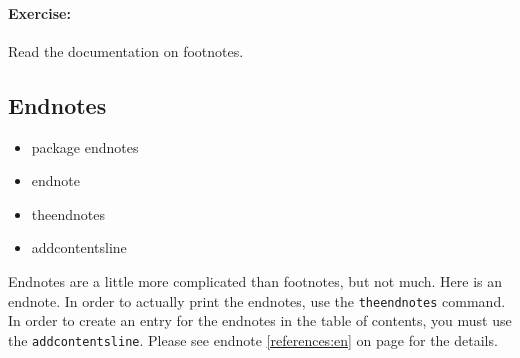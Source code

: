         \paragraph{Exercise:} Read the \Lx{} documentation on footnotes.

    \subsection{Endnotes}
    \label{Endnotes}
        
        \begin{framed}
            \begin{itemize}
                \item{package endnotes}
                \item{endnote}
                \item{theendnotes}
                \item{addcontentsline}
            \end{itemize}
        \end{framed}

    Endnotes are a little more complicated than footnotes, but not much. Here is an endnote. In order to actually print the endnotes, use the \texttt{theendnotes} command. In order to create an entry for the endnotes in the table of contents, you must use the \texttt{addcontentsline}. Please see endnote \ref{references:en} on page \pageref{references:en} for the details.

